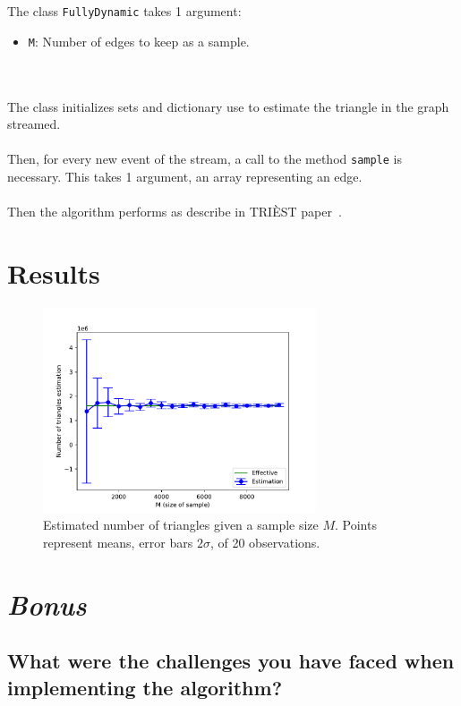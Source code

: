 \documentclass[]{article}
\begin{document}
The class \texttt{FullyDynamic} takes 1 argument:
\begin{itemize}
    \item \texttt{M}: Number of edges to keep as a sample.
\end{itemize}\\
\\
The class initializes sets and dictionary use to estimate the triangle in the graph streamed.\\
\\
Then, for every new event of the stream, a call to the method \texttt{sample} is necessary. This takes 1 argument, an array representing an edge.\\
\\
Then the algorithm performs as describe in TRIÈST paper~\cite{triest}.

\pagebreak

\section{Results}

\begin{figure}[h!]
    \centering
    \includegraphics[width=0.72\textwidth,height=\textheight,keepaspectratio]{../experiment.pdf}
    \caption{Estimated number of triangles given a sample size $M$. Points represent means, error bars $2\sigma$, of 20 observations.}
    \label{fig:1}
\end{figure}

\section{\textit{Bonus}}

\subsection{What were the challenges you have faced when implementing the algorithm?}
\label{optimisation}
\end{document}
